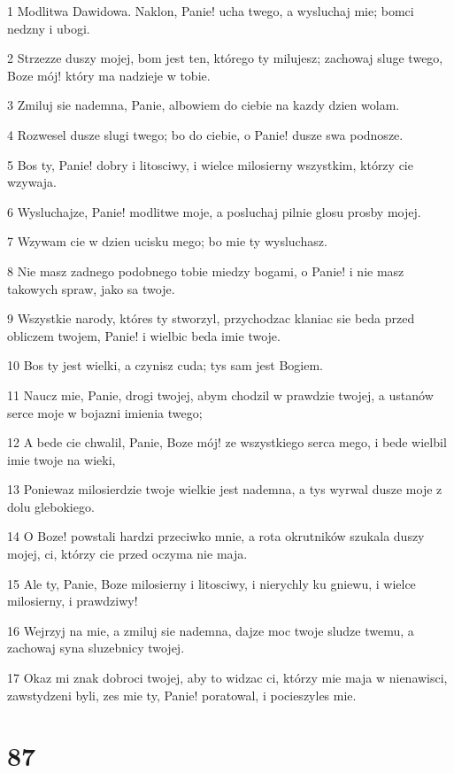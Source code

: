 \par 1 Modlitwa Dawidowa. Naklon, Panie! ucha twego, a wysluchaj mie; bomci nedzny i ubogi.
\par 2 Strzezze duszy mojej, bom jest ten, którego ty milujesz; zachowaj sluge twego, Boze mój! który ma nadzieje w tobie.
\par 3 Zmiluj sie nademna, Panie, albowiem do ciebie na kazdy dzien wolam.
\par 4 Rozwesel dusze slugi twego; bo do ciebie, o Panie! dusze swa podnosze.
\par 5 Bos ty, Panie! dobry i litosciwy, i wielce milosierny wszystkim, którzy cie wzywaja.
\par 6 Wysluchajze, Panie! modlitwe moje, a posluchaj pilnie glosu prosby mojej.
\par 7 Wzywam cie w dzien ucisku mego; bo mie ty wysluchasz.
\par 8 Nie masz zadnego podobnego tobie miedzy bogami, o Panie! i nie masz takowych spraw, jako sa twoje.
\par 9 Wszystkie narody, któres ty stworzyl, przychodzac klaniac sie beda przed obliczem twojem, Panie! i wielbic beda imie twoje.
\par 10 Bos ty jest wielki, a czynisz cuda; tys sam jest Bogiem.
\par 11 Naucz mie, Panie, drogi twojej, abym chodzil w prawdzie twojej, a ustanów serce moje w bojazni imienia twego;
\par 12 A bede cie chwalil, Panie, Boze mój! ze wszystkiego serca mego, i bede wielbil imie twoje na wieki,
\par 13 Poniewaz milosierdzie twoje wielkie jest nademna, a tys wyrwal dusze moje z dolu glebokiego.
\par 14 O Boze! powstali hardzi przeciwko mnie, a rota okrutników szukala duszy mojej, ci, którzy cie przed oczyma nie maja.
\par 15 Ale ty, Panie, Boze milosierny i litosciwy, i nierychly ku gniewu, i wielce milosierny, i prawdziwy!
\par 16 Wejrzyj na mie, a zmiluj sie nademna, dajze moc twoje sludze twemu, a zachowaj syna sluzebnicy twojej.
\par 17 Okaz mi znak dobroci twojej, aby to widzac ci, którzy mie maja w nienawisci, zawstydzeni byli, zes mie ty, Panie! poratowal, i pocieszyles mie.

\chapter{87}

